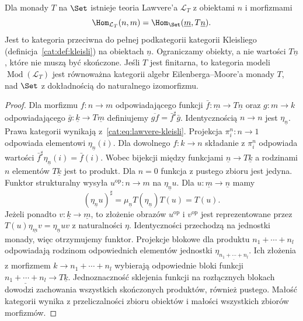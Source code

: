 \begin{twierdzenie}\label{cat:thm:lawvere-from-monad}
Dla monady $T$ na $\Set$ istnieje teoria Lawvere'a $\mathcal L_T$ z obiektami $n$ i morfizmami
\[
 \Hom_{\mathcal L_T}(n,m)=\Hom_{\Set}(\underline m,T\underline n).
\]
Jest to kategoria przeciwna do pełnej podkategorii kategorii Kleisliego (definicja~\ref{cat:def:kleisli}) na obiektach $\underline n$. Ograniczamy obiekty, a nie wartości $T\underline n$, które nie muszą być skończone. Jeśli $T$ jest finitarna, to kategoria modeli $\operatorname{Mod}(\mathcal L_T)$ jest równoważna kategorii algebr Eilenberga--Moore'a monady $T$, nad $\Set$ z dokładnością do naturalnego izomorfizmu.
\end{twierdzenie}
\begin{proof}
Dla morfizmu $f:n\to m$ odpowiadającego funkcji $\bar f:\underline m\to T\underline n$ oraz $g:m\to k$ odpowiadającego $\bar g:\underline k\to T\underline m$ definiujemy $\overline{gf}=\bar f^\sharp\bar g$. Identycznością $n\to n$ jest $\eta_{\underline n}$. Prawa kategorii wynikają z~\eqref{cat:eq:lawvere-kleisli}. Projekcja $\pi_i^n:n\to1$ odpowiada elementowi $\eta_{\underline n}(i)$. Dla dowolnego $f:k\to n$ składanie z $\pi_i^n$ odpowiada wartości $\bar f^\sharp\eta_{\underline n}(i)=\bar f(i)$. Wobec bijekcji między funkcjami $\underline n\to T\underline k$ a rodzinami $n$ elementów $T\underline k$ jest to produkt. Dla $n=0$ funkcja z pustego zbioru jest jedyna. Funktor strukturalny wysyła $u^{\mathrm{op}}:n\to m$ na $\eta_{\underline n}u$. Dla $u:\underline m\to\underline n$ mamy
\[
 (\eta_{\underline n}u)^\sharp
 =\mu_{\underline n}T(\eta_{\underline n})T(u)=T(u).
\]
Jeżeli ponadto $v:\underline k\to\underline m$, to złożenie obrazów $u^{\mathrm{op}}$ i $v^{\mathrm{op}}$ jest reprezentowane przez $T(u)\eta_{\underline m}v=\eta_{\underline n}uv$ z naturalności $\eta$. Identyczności przechodzą na jednostki monady, więc otrzymujemy funktor. Projekcje blokowe dla produktu $n_1+\cdots+n_l$ odpowiadają rodzinom odpowiednich elementów jednostki $\eta_{\underline{n_1+\cdots+n_l}}$. Ich złożenia z morfizmem $k\to n_1+\cdots+n_l$ wybierają odpowiednie bloki funkcji $\underline{n_1+\cdots+n_l}\to T\underline k$. Jednoznaczność sklejenia funkcji na rozłącznych blokach dowodzi zachowania wszystkich skończonych produktów, również pustego. Małość kategorii wynika z przeliczalności zbioru obiektów i małości wszystkich zbiorów morfizmów.


\end{proof}
